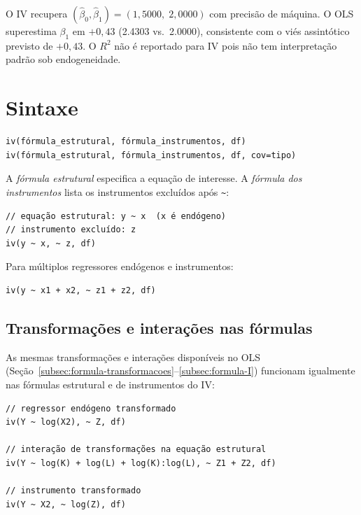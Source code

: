 O IV recupera $(\hat\beta_0, \hat\beta_1) = (1{,}5000,\; 2{,}0000)$ com precisão
de máquina. O OLS superestima $\beta_1$ em $+0{,}43$ (2.4303 vs.\ 2.0000),
consistente com o viés assintótico previsto de $+0{,}43$.
O $R^2$ não é reportado para IV pois não tem interpretação padrão sob endogeneidade.

\section{Sintaxe}

\begin{lstlisting}
iv(fórmula_estrutural, fórmula_instrumentos, df)
iv(fórmula_estrutural, fórmula_instrumentos, df, cov=tipo)
\end{lstlisting}

A \textit{fórmula estrutural} especifica a equação de interesse. A
\textit{fórmula dos instrumentos} lista os instrumentos excluídos após \lstinline{~}:

\begin{lstlisting}[caption={IV básico — um instrumento}]
// equação estrutural: y ~ x  (x é endógeno)
// instrumento excluído: z
iv(y ~ x, ~ z, df)
\end{lstlisting}

Para múltiplos regressores endógenos e instrumentos:

\begin{lstlisting}
iv(y ~ x1 + x2, ~ z1 + z2, df)
\end{lstlisting}

\subsection{Transformações e interações nas fórmulas}
\label{subsec:iv-formula-avancada}

As mesmas transformações e interações disponíveis no OLS
(Seção~\ref{subsec:formula-transformacoes}--\ref{subsec:formula-I})
funcionam igualmente nas fórmulas estrutural e de instrumentos do IV:

\begin{lstlisting}[caption={IV com transformações e interações}]
// regressor endógeno transformado
iv(Y ~ log(X2), ~ Z, df)

// interação de transformações na equação estrutural
iv(Y ~ log(K) + log(L) + log(K):log(L), ~ Z1 + Z2, df)

// instrumento transformado
iv(Y ~ X2, ~ log(Z), df)
\end{lstlisting}

